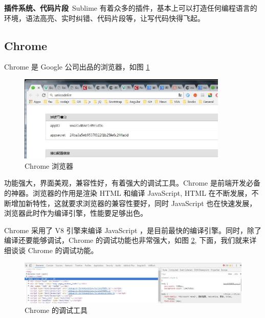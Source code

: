             \textbf{插件系统、代码片段}\, Sublime 有着众多的插件，基本上可以打造任何编程语言的环境，语法高亮、实时纠错、代码片段等，让写代码快得飞起。

        \subsection{Chrome}
          \label{subsec:chrome}
            Chrome 是 Google 公司出品的浏览器，如图 \ref{fig:chrome}
            \begin{figure}[H]
              \centering
              \includegraphics[width=10cm]{./img/chrome.jpg}
              \caption{Chrome 浏览器}
              \label{fig:chrome}
            \end{figure}
            功能强大，界面美观，兼容性好，有着强大的调试工具。Chrome 是前端开发必备的神器。浏览器的作用是渲染 HTML 和编译 JavaScript, HTML 在不断发展，不断增加新特性，这就要求浏览器的兼容性要好，同时 JavaScript 也在快速发展，浏览器此时作为编译引擎，性能要足够出色。
            \par
            Chrome 采用了 V8 引擎来编译 JavaScript ，是目前最快的编译引擎。同时，除了编译还要能够调试，Chrome 的调试功能也非常强大，如图 \ref{fig:chrome_debug}, 下面，我们就来详细谈谈 Chrome 的调试功能。
            \begin{figure}[H]
              \centering
              \includegraphics[width=\textwidth]{./img/chrome_debug.jpg}
              \caption{Chrome 的调试工具}
              \label{fig:chrome_debug}
            \end{figure}

